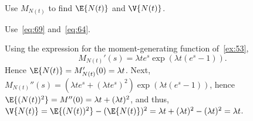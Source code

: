 \begin{exercise} \label{ex:l-101}
 Use $M_{N(t)}$ to find $\E{N(t)}$ and $\V{N(t)}$.
\begin{hint}
Use~\cref{eq:69} and~\cref{eq:64}.
\end{hint}
\begin{solution}
Using the expression for the moment-generating function of~\cref{ex:53},
 \begin{equation*}
 M_{N(t)}'(s) = \lambda t e^s \exp(\lambda t(e^s - 1)).
 \end{equation*}
Hence $\E{N(t)} = M_{N(t)}'(0) = \lambda t $. Next,
$M_{N(t)}''(s) = (\lambda t e^s + (\lambda t e^s)^2) \exp(\lambda t(e^s - 1))$,
hence $\E{(N(t))^2} = M''(0) = \lambda t + (\lambda t)^2$, and thus,
$\V{N(t)} =\E{(N(t))^2}-(\E{N(t)})^2 = \lambda t + (\lambda t)^2 - (\lambda t)^2 = \lambda t$.
\end{solution}
\end{exercise}





